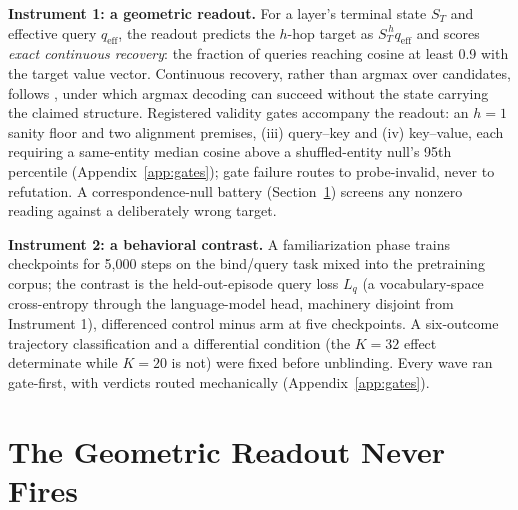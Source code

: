\documentclass{article} %
\begin{document}
\textbf{Instrument 1: a geometric readout.} For a layer's terminal state
$S_T$ and effective query $q_{\mathrm{eff}}$, the readout predicts the
$h$-hop target as $S_T^{\,h} q_{\mathrm{eff}}$ and scores \emph{exact
continuous recovery}: the fraction of queries reaching cosine at least 0.9
with the target value vector. Continuous recovery, rather than argmax over
candidates, follows \citet{nichani2024understanding}, under which argmax
decoding can succeed without the state carrying the claimed structure.
Registered validity gates accompany the readout: an $h{=}1$ sanity floor
and two alignment premises, (iii) query--key and (iv) key--value, each
requiring a same-entity median cosine above a shuffled-entity null's 95th
percentile (Appendix~\ref{app:gates}); gate failure routes to
probe-invalid, never to refutation. A correspondence-null battery
(Section~\ref{sec:geometric}) screens any nonzero reading against a
deliberately wrong target.

\textbf{Instrument 2: a behavioral contrast.} A familiarization phase
trains checkpoints for 5{,}000 steps on the bind/query task mixed into the
pretraining corpus; the contrast is the held-out-episode query loss $L_q$
(a vocabulary-space cross-entropy through the language-model head,
machinery disjoint from Instrument 1), differenced control minus arm at
five checkpoints. A six-outcome trajectory classification and a
differential condition (the $K{=}32$ effect determinate while $K{=}20$ is
not) were fixed before unblinding. Every wave ran gate-first, with
verdicts routed mechanically (Appendix~\ref{app:gates}).

\section{The Geometric Readout Never Fires}
\label{sec:geometric}
\end{document}
